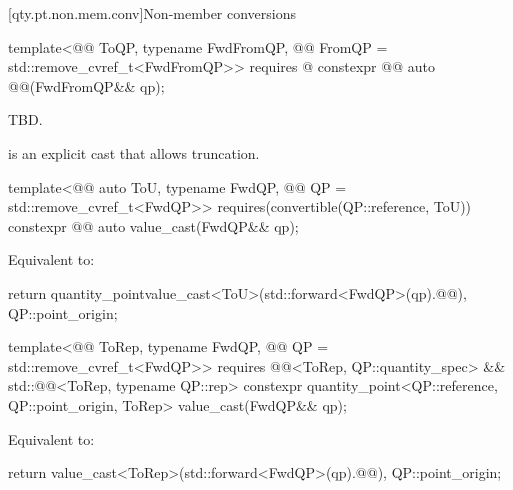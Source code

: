 [qty.pt.non.mem.conv]{Non-member conversions}

\begin{itemdecl}
template<@@ ToQP, typename FwdFromQP,
         @@ FromQP = std::remove_cvref_t<FwdFromQP>>
  requires @\seebelownc@
constexpr @@ auto @@(FwdFromQP&& qp);
\end{itemdecl}

\begin{itemdescr}
\pnum
\returns
TBD.
\end{itemdescr}

\pnum
{} is an explicit cast that allows truncation.

\begin{itemdecl}
template<@@ auto ToU, typename FwdQP, @@ QP = std::remove_cvref_t<FwdQP>>
  requires(convertible(QP::reference, ToU))
constexpr @@ auto value_cast(FwdQP&& qp);
\end{itemdecl}

\begin{itemdescr}
\pnum
\effects
Equivalent to:
\begin{codeblock}
return quantity_point{value_cast<ToU>(std::forward<FwdQP>(qp).@@),
                      QP::point_origin};
\end{codeblock}
\end{itemdescr}

\begin{itemdecl}
template<@@ ToRep, typename FwdQP, @@ QP = std::remove_cvref_t<FwdQP>>
  requires @@<ToRep, QP::quantity_spec> &&
           std::@@<ToRep, typename QP::rep>
constexpr quantity_point<QP::reference, QP::point_origin, ToRep> value_cast(FwdQP&& qp);
\end{itemdecl}

\begin{itemdescr}
\pnum
\effects
Equivalent to:
\begin{codeblock}
return {value_cast<ToRep>(std::forward<FwdQP>(qp).@@), QP::point_origin};
\end{codeblock}
\end{itemdescr}

